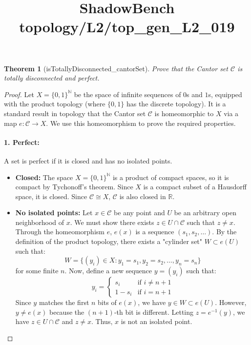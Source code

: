 \documentclass{article}
\title{ShadowBench topology/L2/top\_gen\_L2\_019}
\newtheorem{theorem}{Theorem}
\begin{document}
\maketitle

\begin{theorem}[isTotallyDisconnected_cantorSet]
Prove that the Cantor set $\mathcal{C}$ is totally disconnected and perfect. 
\end{theorem}

\begin{proof}
Let $X = \{0, 1\}^\mathbb{N}$ be the space of infinite sequences of $0$s and $1$s, equipped with the product topology (where $\{0, 1\}$ has the discrete topology). It is a standard result in topology that the Cantor set $\mathcal{C}$ is homeomorphic to $X$ via a map $e: \mathcal{C} \to X$. We use this homeomorphism to prove the required properties.

\paragraph{1. Perfect:}
A set is perfect if it is closed and has no isolated points.
\begin{itemize}
    \item \textbf{Closed:} The space $X = \{0, 1\}^\mathbb{N}$ is a product of compact spaces, so it is compact by Tychonoff's theorem. Since $X$ is a compact subset of a Hausdorff space, it is closed. Since $\mathcal{C} \cong X$, $\mathcal{C}$ is also closed in $\mathbb{R}$.
    
    \item \textbf{No isolated points:} Let $x \in \mathcal{C}$ be any point and $U$ be an arbitrary open neighborhood of $x$. We must show there exists $z \in U \cap \mathcal{C}$ such that $z \neq x$.
    Through the homeomorphism $e$, $e(x)$ is a sequence $(s_1, s_2, \dots)$. By the definition of the product topology, there exists a "cylinder set" $W \subset e(U)$ such that:
    \[ W = \{ (y_i) \in X : y_1 = s_1, y_2 = s_2, \dots, y_n = s_n \} \]
    for some finite $n$. Now, define a new sequence $y = (y_i)$ such that:
    \[ y_i = 
    \begin{cases} 
    s_i & \text{if } i \neq n+1 \\
    1 - s_i & \text{if } i = n+1 
    \end{cases} \]
    Since $y$ matches the first $n$ bits of $e(x)$, we have $y \in W \subset e(U)$. However, $y \neq e(x)$ because the $(n+1)$-th bit is different. Letting $z = e^{-1}(y)$, we have $z \in U \cap \mathcal{C}$ and $z \neq x$. Thus, $x$ is not an isolated point.
\end{itemize}


\end{proof}
\end{document}
